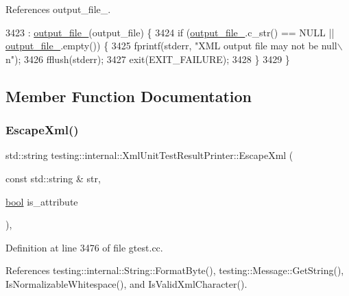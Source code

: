 References output\+\_\+file\+\_\+.


\begin{DoxyCode}
3423     : \hyperlink{classtesting_1_1internal_1_1XmlUnitTestResultPrinter_aa81cc4540d16279f5eb5f7ec9f366ea7}{output\_file\_}(output\_file) \{
3424   \textcolor{keywordflow}{if} (\hyperlink{classtesting_1_1internal_1_1XmlUnitTestResultPrinter_aa81cc4540d16279f5eb5f7ec9f366ea7}{output\_file\_}.c\_str() == NULL || \hyperlink{classtesting_1_1internal_1_1XmlUnitTestResultPrinter_aa81cc4540d16279f5eb5f7ec9f366ea7}{output\_file\_}.empty()) \{
3425     fprintf(stderr, \textcolor{stringliteral}{"XML output file may not be null\(\backslash\)n"});
3426     fflush(stderr);
3427     exit(EXIT\_FAILURE);
3428   \}
3429 \}
\end{DoxyCode}


\subsection{Member Function Documentation}
\mbox{\label{classtesting_1_1internal_1_1XmlUnitTestResultPrinter_adadf42cf46ade9b26743466ce4b52f36}} 
\subsubsection{\texorpdfstring{Escape\+Xml()}{EscapeXml()}}
{\footnotesize\ttfamily std\+::string testing\+::internal\+::\+Xml\+Unit\+Test\+Result\+Printer\+::\+Escape\+Xml (\begin{DoxyParamCaption}\item[{const std\+::string \&}]{str,  }\item[{\hyperlink{classbool}{bool}}]{is\+\_\+attribute }\end{DoxyParamCaption})\hspace{0.3cm}{\ttfamily [static]}, {\ttfamily [private]}}



Definition at line 3476 of file gtest.\+cc.



References testing\+::internal\+::\+String\+::\+Format\+Byte(), testing\+::\+Message\+::\+Get\+String(), Is\+Normalizable\+Whitespace(), and Is\+Valid\+Xml\+Character().


